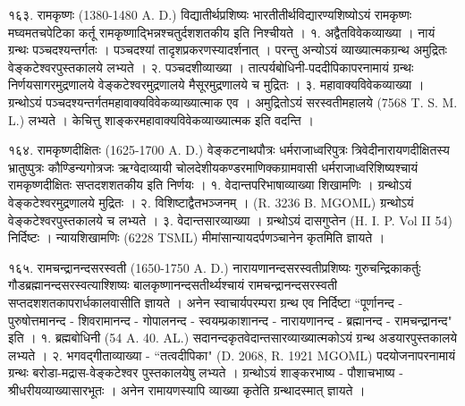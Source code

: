 १६३. रामकृष्णः (1380-1480 A. D.)
विद्यातीर्थप्रशिष्यः भारतीतीर्थविद्यारण्यशिष्योऽयं रामकृष्णः मघ्वमतचपेटिका कर्तू रामकृष्णाद्भिन्नश्चतुर्दशशतकीय इति निश्चीयते ।
१. अद्वैतविवेकव्याख्या । नायं ग्रन्थः पञ्चदश्यन्तर्गतः । पञ्चदश्यां तादृशप्रकरणस्यादर्शनात् । परन्तु अन्योऽयं व्याख्यात्मकग्रन्थ अमुद्रितः वेङ्कटेश्वरपुस्तकालये लभ्यते ।
२. पञ्चदशीव्याख्या । तात्पर्यबोधिनी-पददीपिकापरनामायं ग्रन्थः निर्णयसागरमुद्रणालये वेङ्कटेश्वरमुद्रणालये मैसूरमुद्रणालये च मुद्रितः ।
३. महावाक्यविवेकव्याख्या । ग्रन्थोऽयं पञ्चदश्यन्तर्गतमहावाक्यविवेकव्याख्यात्माक एव । अमुद्रितोऽयं सरस्वतीमहालये (7568 T. S. M. L.) लभ्यते । केचित्तु शाङ्करमहावाक्यविवेकव्याख्यात्मक इति वदन्ति ।

१६४. रामकृष्णदीक्षितः (1625-1700 A. D.)
वेङ्कटनाथपौत्रः धर्मराजाध्वरिपुत्रः त्रिवेदीनारायणदीक्षितस्य भ्रातुष्पुत्रः कौण्डिन्यगोत्रजः ऋग्वेदाव्यायी चोलदेशीयकण्डरमाणिक्कग्रामवासी धर्मराजाध्वरिशिष्यश्चायं रामकृष्णदीक्षितः सप्तदशशतकीय इति निर्णयः ।
१. वेदान्तपरिभाषाव्याख्या शिखामणिः । ग्रन्थोऽयं वेङ्कटेश्वरमुद्रणालये मुद्रितः ।
२. विशिष्टाद्वैतभञ्जनम् । (R. 3236 B. MGOML) ग्रन्थोऽयं वेङ्कटेश्वरपुस्तकालये च लभ्यते ।
३. वेदान्तसारव्याख्या । ग्रन्थोऽयं दासगुप्तेन (H. I. P. Vol II 54) निर्दिष्टः । न्यायशिखामणिः (6228 TSML) मीमांसान्यायदर्पणञ्चानेन कृतमिति ज्ञायते ।

१६५. रामचन्द्रानन्दसरस्वती (1650-1750 A. D.)
नारायणानन्दसरस्वतीप्रशिष्यः गुरुचन्द्रिकाकर्तुः गौडब्रह्मानन्दसरस्वत्याश्शिष्यः बालकृष्णानन्दसतीर्थ्यश्चायं रामचन्द्रानन्दसरस्वती सप्तदशशतकापरार्धकालवासीति ज्ञायते ।
अनेन स्वाचार्यपरम्परा ग्रन्थ एव निर्दिष्टा ``पूर्णानन्द - पुरुषोत्तमानन्द - शिवरामानन्द - गोपालनन्द - स्वयम्प्रकाशानन्द - नारायणानन्द - ब्रह्मानन्द - रामचन्द्रानन्द" इति ।
१. ब्रह्मबोधिनी (54 A. 40. AL.) सदानन्दकृतवेदान्तसारव्याख्यात्मकोऽयं ग्रन्थ अडयारपुस्तकालये लभ्यते ।
२. भगवद्गीताव्याख्या - ``तत्वदीपिका" (D. 2068, R. 1921 MGOML) पदयोजनापरनामायं ग्रन्थः बरोडा-मद्रास-वेङ्कटेश्वर पुस्तकालयेषु लभ्यते । ग्रन्थोऽयं शाङ्करभाष्य - पौशाचभाष्य - श्रीधरीयव्याख्यासारभूतः । अनेन रामायणस्यापि व्याख्या कृतेति ग्रन्थादस्मात् ज्ञायते ।

